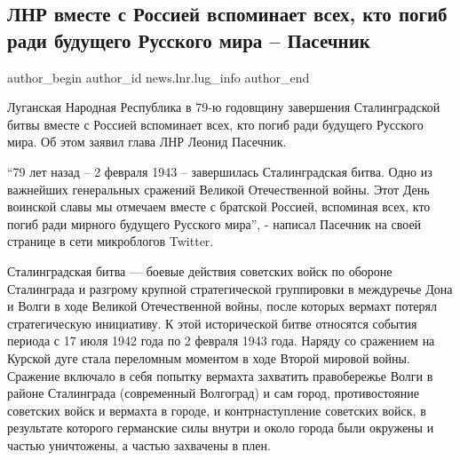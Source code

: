  
 
 
 
 
 
\subsection{ЛНР вместе с Россией вспоминает всех, кто погиб ради будущего Русского мира – Пасечник}
\label{sec:02_02_2022.stz.news.lnr.lug_info.1.rusmir}
 
\ifcmt
 author_begin
   author_id news.lnr.lug_info
 author_end
\fi

Луганская Народная Республика в 79-ю годовщину завершения Сталинградской битвы
вместе с Россией вспоминает всех, кто погиб ради будущего Русского мира. Об
этом заявил глава ЛНР Леонид Пасечник.

\enquote{79 лет назад – 2 февраля 1943 – завершилась Сталинградская битва. Одно из
важнейших генеральных сражений Великой Отечественной войны. Этот День воинской
славы мы отмечаем вместе с братской Россией, вспоминая всех, кто погиб ради
мирного будущего Русского мира}, - написал Пасечник на своей странице в сети
микроблогов Twitter.


Сталинградская битва — боевые действия советских войск по обороне Сталинграда и
разгрому крупной стратегической группировки в междуречье Дона и Волги в ходе
Великой Отечественной войны, после которых вермахт потерял стратегическую
инициативу. К этой исторической битве относятся события периода с 17 июля 1942
года по 2 февраля 1943 года. Наряду со сражением на Курской дуге стала
переломным моментом в ходе Второй мировой войны. Сражение включало в себя
попытку вермахта захватить правобережье Волги в районе Сталинграда (современный
Волгоград) и сам город, противостояние советских войск и вермахта в городе, и
контрнаступление советских войск, в результате которого германские силы внутри
и около города были окружены и частью уничтожены, а частью захвачены в плен.

